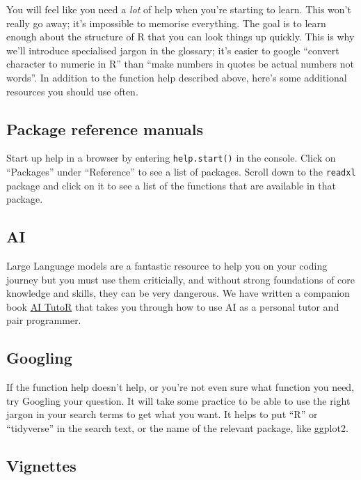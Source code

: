 \documentclass[
  oneside]{book}
\begin{document}
You will feel like you need a \emph{lot} of help when you're starting to learn. This won't really go away; it's impossible to memorise everything. The goal is to learn enough about the structure of R that you can look things up quickly. This is why we'll introduce specialised jargon in the glossary; it's easier to google ``convert character{} to numeric{} in R'' than ``make numbers in quotes be actual numbers not words''. In addition to the function help described above, here's some additional resources you should use often.

\subsection{Package reference manuals}\label{package-reference-manuals}

Start up help in a browser by entering \texttt{help.start()} in the console. Click on ``Packages'' under ``Reference'' to see a list of packages. Scroll down to the \texttt{readxl} package and click on it to see a list of the functions that are available in that package.

\subsection{AI}\label{ai}

Large Language models are a fantastic resource to help you on your coding journey but you must use them criticially, and without strong foundations of core knowledge and skills, they can be very dangerous. We have written a companion book \href{https://psyteachr.github.io/AITutoR/}{AI TutoR} that takes you through how to use AI as a personal tutor and pair programmer.

\subsection{Googling}\label{googling}

If the function help doesn't help, or you're not even sure what function you need, try Googling your question. It will take some practice to be able to use the right jargon in your search terms to get what you want. It helps to put ``R'' or ``tidyverse'' in the search text, or the name of the relevant package, like ggplot2.

\subsection{Vignettes}\label{vignettes}
\end{document}
